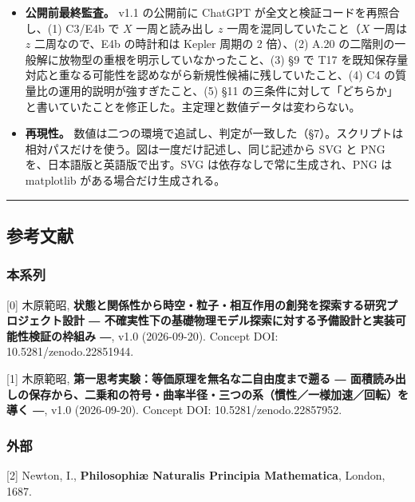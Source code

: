 \documentclass[
  a4paper,
]{ltjsarticle}
\begin{document}
\begin{itemize}
  は修正指示が適用されないまま公開に至ったことによる。検算した Claude
  Code は (1)(3)(6)
  に適用中に気づいていたが、警告せずに付記にとどめていた。
\item
  \textbf{公開前最終監査。} v1.1 の公開前に ChatGPT
  が全文と検証コードを再照合し、(1) C3/E4b で \(X\) 一周と読み出し \(z\)
  一周を混同していたこと（\(X\) 一周は \(z\) 二周なので、E4b の時計和は
  Kepler 周期の 2 倍）、(2) A.20
  の二階則の一般解に放物型の重根を明示していなかったこと、(3) §9 で T17
  を既知保存量対応と重なる可能性を認めながら新規性候補に残していたこと、(4)
  C4 の質量比の運用的説明が強すぎたこと、(5) §11
  の三条件に対して「どちらか」と書いていたことを修正した。主定理と数値データは変わらない。
\item
  \textbf{再現性。}
  数値は二つの環境で追試し、判定が一致した（§7）。スクリプトは相対パスだけを使う。図は一度だけ記述し、同じ記述から
  SVG と PNG を、日本語版と英語版で出す。SVG
  は依存なしで常に生成され、PNG は matplotlib がある場合だけ生成される。
\end{itemize}

\begin{center}\rule{0.5\linewidth}{0.5pt}\end{center}

\subsection{参考文献}\label{ux53c2ux8003ux6587ux732e}

\subsubsection{本系列}\label{ux672cux7cfbux5217}

{[}0{]} 木原範昭,
\textbf{状態と関係性から時空・粒子・相互作用の創発を探索する研究プロジェクト設計
― 不確実性下の基礎物理モデル探索に対する予備設計と実装可能性検証の枠組み
―}, v1.0 (2026-09-20). Concept DOI: 10.5281/zenodo.22851944.

{[}1{]} 木原範昭, \textbf{第一思考実験：等価原理を無名な二自由度まで遡る
―
面積読み出しの保存から、二乗和の符号・曲率半径・三つの系（慣性／一様加速／回転）を導く
―}, v1.0 (2026-09-20). Concept DOI: 10.5281/zenodo.22857952.

\subsubsection{外部}\label{ux5916ux90e8}

{[}2{]} Newton, I., \textbf{Philosophiæ Naturalis Principia
Mathematica}, London, 1687.
\end{document}
